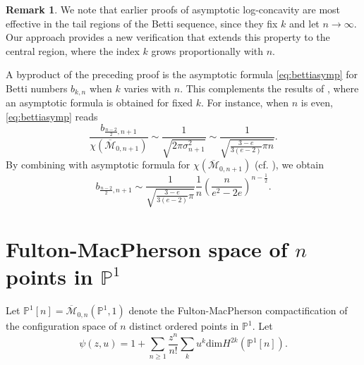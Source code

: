 \documentclass[11pt,letterpaper]{amsart}
\numberwithin{equation}{section}
\theoremstyle{definition}
\newtheorem{remark}[theorem]{Remark}
\newcommand{\PP}{\mathbb{P}}
\newcommand{\cal}{\mathcal}
\def\cM{{\cal M}}
\def\mzno{\overline{\cM}_{0,n+1} }
\def\dim{\mathrm{dim} }
\def\beq{\begin{equation}}
\def\eeq{\end{equation}}
\def\fmn{\overline{\mathcal{M}}_{0,n}(\PP^1,1)}
\begin{document}
\begin{remark}
We note that earlier proofs of asymptotic log-concavity \cite{ACM, CKL2} are most effective in the tail regions of the Betti sequence, since they fix $k$ and let $n\to \infty$. Our approach provides a new verification that extends this property to the central region, where the index $k$ grows proportionally with $n$.
\end{remark}

A byproduct of the preceding proof is the asymptotic formula \eqref{eq:bettiasymp} for Betti numbers $b_{k,n}$ when $k$ varies with $n$. This complements the results of \cite{ACM}, where an asymptotic formula is obtained for fixed $k$. For instance, when $n$ is even, \eqref{eq:bettiasymp} reads
\[ \frac{b_{\frac{n-2}{2}, n+1}}{\chi(\mzno)} \sim  \frac{1}{\sqrt{2\pi\sigma_{n+1}^2 }}\sim  \frac{1}{\sqrt{\frac{3-e}{3(e-2)}\pi n}}.\]
By combining with asymptotic formula for $\chi(\mzno)$ (cf. \cite[IV. Theorem.4.2.1]{Manin}), we obtain
\[ b_{\frac{n-2}{2}, n+1}\sim \frac{1}{\sqrt{\frac{3-e}{3(e-2)}\pi}} \frac{1}{n}\left(\frac{n}{e^2-2e} \right)^{n-\frac{1}{2}}. \]



\section{Fulton-MacPherson space of $n$ points in $\PP^1$}\label{sec:FM}

Let $\PP^1[n]=\fmn$ denote the Fulton-MacPherson compactification of the configuration space of $n$ distinct ordered points in $\PP^1$. Let
\beq\label{2} \psi(z,u)=1+\sum_{n\ge 1}\frac{z^n}{n!} \sum_k u^k\dim H^{2k}(\PP^1[n]).\eeq
\end{document}
